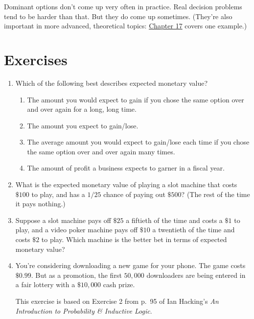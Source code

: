 \documentclass[justified]{tufte-book}
\providecommand{\tightlist}{%
  \setlength{\itemsep}{0pt}\setlength{\parskip}{0pt}}
\theoremstyle{definition}
\theoremstyle{definition}
\theoremstyle{definition}
\theoremstyle{remark}
\begin{document}
Dominant options don't come up very often in practice. Real decision
problems tend to be harder than that. But they do come up sometimes.
(They're also important in more advanced, theoretical topics:
\protect\hyperlink{dutch-books-1}{Chapter 17} covers one example.)

\hypertarget{exercises-8}{%
\section*{Exercises}\label{exercises-8}}

\begin{enumerate}
\item
  Which of the following best describes expected monetary value?

  \begin{enumerate}
  \def\labelenumii{\alph{enumii}.}
  \tightlist
  \item
    The amount you would expect to gain if you chose the same option
    over and over again for a long, long time.
  \item
    The amount you expect to gain/lose.
  \item
    The average amount you would expect to gain/lose each time if you
    chose the same option over and over again many times.
  \item
    The amount of profit a business expects to garner in a fiscal year.
  \end{enumerate}
\item
  What is the expected monetary value of playing a slot machine that
  costs \(\$100\) to play, and has a \(1/25\) chance of paying out
  \(\$500\)? (The rest of the time it pays nothing.)
\item
  Suppose a slot machine pays off \(\$25\) a fiftieth of the time and
  costs a \(\$1\) to play, and a video poker machine pays off \(\$10\) a
  twentieth of the time and costs \(\$2\) to play. Which machine is the
  better bet in terms of expected monetary value?
\item
  You're considering downloading a new game for your phone. The game
  costs \(\$0.99\). But as a promotion, the first \(50,000\) downloaders
  are being entered in a fair lottery with a \(\$10,000\) cash prize.

  \begin{marginfigure}
  This exercise is based on Exercise 2 from p.~95 of Ian Hacking's
  \emph{An Introduction to Probability \& Inductive Logic}.
  \end{marginfigure}


\end{enumerate}
\end{document}
